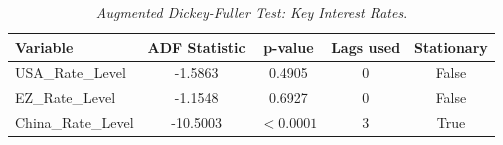 \begin{table}[h]
  \centering
  \caption{\textit{Augmented Dickey-Fuller Test: Key Interest Rates}.}
  \label{tab:adfkir}
  \begin{tabular}{lcccc}
    \toprule
    \textbf{Variable} & \textbf{ADF Statistic} & \textbf{p-value} & \textbf{Lags used} & \textbf{Stationary} \\ 
    \midrule
    USA\_Rate\_Level & -1.5863 & 0.4905 & 0 & False \\ 
    EZ\_Rate\_Level & -1.1548 & 0.6927 & 0 & False \\ 
    China\_Rate\_Level & -10.5003 & $< 0.0001$ & 3 & True \\ 
    \bottomrule
  \end{tabular}
\end{table}